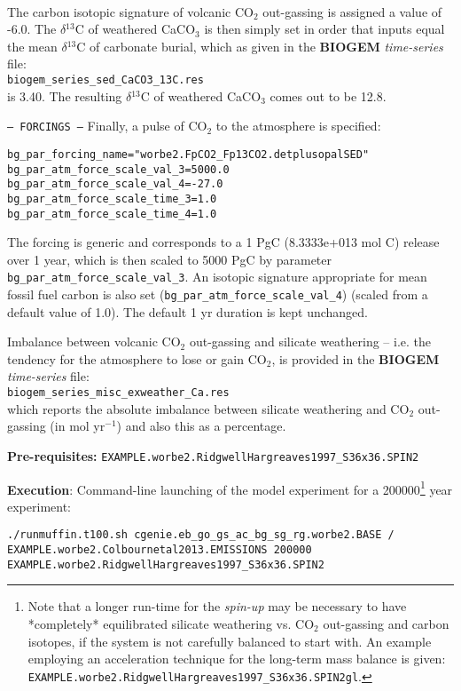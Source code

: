 \documentclass[10pt,twoside]{article}
\begin{document}
\begin{compactitem}
\\The carbon isotopic signature of volcanic CO$_{2}$ out-gassing is assigned a value of -6.0\permil. The $\delta$$^{13}$C of weathered CaCO$_{3}$ is then simply set in order that inputs equal the mean $\delta$$^{13}$C of carbonate burial, which as given in the \textbf{BIOGEM} \textit{time-series} file:
\\\texttt{biogem\_series\_sed\_CaCO3\_13C.res}
\\is 3.40\permil. The resulting $\delta$$^{13}$C of weathered CaCO$_{3}$ comes out to be 12.8\permil.
                \item \texttt{--- FORCINGS ---}
Finally, a pulse of CO$_{2}$ to the atmosphere is specified:
\vspace{-5pt}\begin{verbatim}
bg_par_forcing_name="worbe2.FpCO2_Fp13CO2.detplusopalSED"
bg_par_atm_force_scale_val_3=5000.0
bg_par_atm_force_scale_val_4=-27.0
bg_par_atm_force_scale_time_3=1.0
bg_par_atm_force_scale_time_4=1.0
                \end{verbatim}\vspace{-5pt}
The forcing is generic and corresponds to a 1 PgC (8.3333e+013 mol C) release over 1 year, which is then scaled to 5000 PgC by parameter \texttt{bg\_par\_atm\_force\_scale\_val\_3}. An isotopic signature appropriate for mean fossil fuel carbon is also set (\texttt{bg\_par\_atm\_force\_scale\_val\_4}) (scaled from a default value of 1.0). The default 1 yr duration is kept unchanged.
\end{compactitem}

\noindent Imbalance between volcanic CO$_{2}$ out-gassing and silicate weathering -- i.e. the tendency for the atmosphere to lose or gain CO$_{2}$, is provided in the \textbf{BIOGEM} \textit{time-series} file:
\\\texttt{biogem\_series\_misc\_exweather\_Ca.res}
\\which reports the absolute imbalance between silicate weathering and CO$_{2}$ out-gassing (in mol yr$^{-1}$) and also this as a percentage.

\noindent \textbf{Pre-requisites:} \texttt{EXAMPLE.worbe2.RidgwellHargreaves1997\_S36x36.SPIN2}

\noindent \textbf{Execution}: Command-line launching of the model experiment for a 200000\footnote{Note that a longer run-time for the \textit{spin-up} may be necessary to have *completely* equilibrated silicate weathering vs. CO$_{2}$ out-gassing and carbon isotopes, if the system is not carefully balanced to start with. An example employing an acceleration technique for the long-term mass balance is given: \\ \texttt{EXAMPLE.worbe2.RidgwellHargreaves1997\_S36x36.SPIN2gl}.} year experiment:
\vspace{-10pt}\small\begin{verbatim}
./runmuffin.t100.sh cgenie.eb_go_gs_ac_bg_sg_rg.worbe2.BASE / 
EXAMPLE.worbe2.Colbournetal2013.EMISSIONS 200000 
EXAMPLE.worbe2.RidgwellHargreaves1997_S36x36.SPIN2
\end{verbatim}\normalsize\vspace{-10pt}
\end{document}
